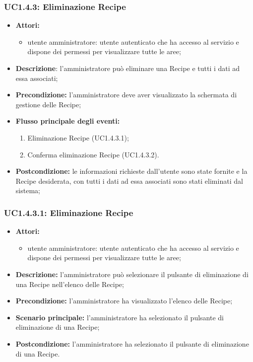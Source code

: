 \subsubsection{UC1.4.3: Eliminazione Recipe}
\begin{itemize}
	\item \textbf{Attori:}
	\begin{itemize}
		\item utente amministratore: utente autenticato che ha accesso al servizio e dispone dei permessi per visualizzare tutte le aree;
	\end{itemize}
	\item \textbf{Descrizione}: l'amministratore può eliminare una Recipe e tutti i dati ad essa associati;
	\item \textbf{Precondizione:} l'amministratore deve aver visualizzato la schermata di gestione delle Recipe;
	\item \textbf{Flusso principale degli eventi:}
	\begin{enumerate}
		\item Eliminazione Recipe (UC1.4.3.1);
		\item Conferma eliminazione Recipe (UC1.4.3.2).
	\end{enumerate}
	\item \textbf{Postcondizione:} le informazioni richieste dall'utente sono state fornite e la Recipe desiderata, con tutti i dati ad essa associati sono stati eliminati dal sistema;
\end{itemize}

\subsubsection{UC1.4.3.1: Eliminazione Recipe}
\begin{itemize}
	\item \textbf{Attori:}
	\begin{itemize}
		\item utente amministratore: utente autenticato che ha accesso al servizio e dispone dei permessi per visualizzare tutte le aree;
	\end{itemize}
	\item \textbf{Descrizione:} l'amministratore può selezionare il pulsante di eliminazione di una Recipe nell'elenco delle Recipe;
	\item \textbf{Precondizione:} l'amministratore ha visualizzato l'elenco delle Recipe;
	\item \textbf{Scenario principale:} l'amministratore ha selezionato il pulsante di eliminazione di una Recipe;
	\item \textbf{Postcondizione:} l'amministratore ha selezionato il pulsante di eliminazione di una Recipe.
\end{itemize}

